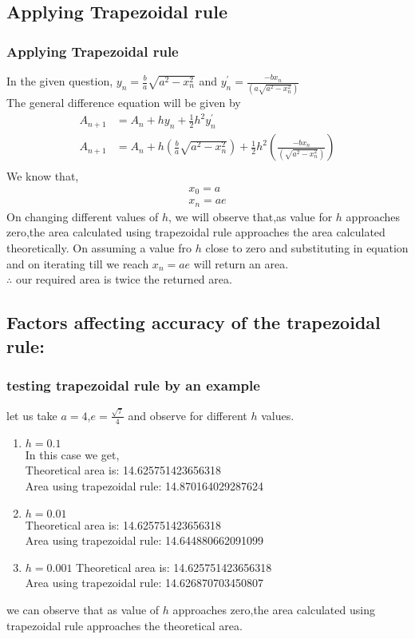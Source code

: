 \documentclass{beamer}
\providecommand{\brak}[1]{\ensuremath{\left(#1\right)}}
\theoremstyle{remark}
\numberwithin{equation}{section}
\begin{document}
\subsection{Applying Trapezoidal rule}
\begin{frame}
\frametitle{Applying Trapezoidal rule}
In the given question, $y_n=\frac{b}{a}\sqrt{a^2-x_n^2}$ and $y^{\prime}_n= \frac{-bx_n}{\brak{a\sqrt{a^2-x_n^2}}}$\\
The general difference equation will be given by
\begin{align}
  A_{n+1}&=A_n+hy_n+\frac{1}{2}h^2y^{\prime}_n\\
  A_{n+1}&=A_n+h\brak{\frac{b}{a}\sqrt{a^2-x_n^2}}+\frac{1}{2}h^2\brak{\frac{-bx_n}{\brak{\sqrt{a^2-x_n^2}}}}\\
\end{align}
We know that,
\begin{align}
    x_0 = a\\
    x_n = ae
\end{align}
On changing different values of $h$, we will observe that,as value for $h$ approaches zero,the area calculated using trapezoidal rule approaches the area calculated theoretically.
On assuming a value fro $h$ close to zero and substituting in equation and on iterating till we reach $x_n=ae$ will return an area.\\
$\therefore$ our required area is twice the returned area.\\
\end{frame}

\subsection{Factors affecting accuracy of the trapezoidal rule: }
\begin{frame}
\frametitle{testing trapezoidal rule by an example}
let us take $a = 4$,$e = \frac{\sqrt{7}}{4}$ and observe for different $h$ values.
\begin{enumerate}
    \item  $h = 0.1$\\
    In this case we get, \\
Theoretical area is:  14.625751423656318\\
Area using trapezoidal rule:  14.870164029287624\\
\item $h = 0.01$\\
Theoretical area is:  14.625751423656318\\
Area using trapezoidal rule:  14.644880662091099\\
\item $h = 0.001$
Theoretical area is:  14.625751423656318\\
Area using trapezoidal rule:  14.626870703450807\\
\end{enumerate}
we can observe that as value of $h$ approaches zero,the area calculated using trapezoidal rule approaches the theoretical area.
\end{frame}
\end{document}
